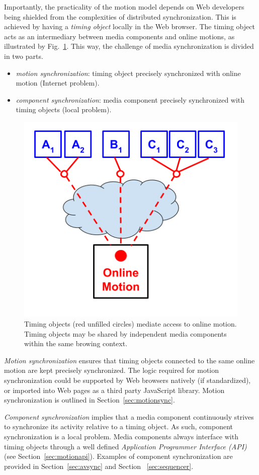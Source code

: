 Importantly, the practicality of the motion model depends on Web developers
being shielded from the complexities of distributed synchronization. This is
achieved by having a \emph{timing object} locally in the Web browser. The
timing object acts as an intermediary between media components and online
motions, as illustrated by Fig.~\ref{fig:model-2}. This way, the challenge of
media synchronization is divided in two parts.

\begin{itemize}
\item{\emph{motion synchronization}: timing object precisely synchronized with online motion (Internet problem).}
\item{\emph{component synchronization}: media component precisely synchronized with timing objects (local problem).} 
\end{itemize}


\begin{figure}[h]
\centering
\includegraphics[scale=.4]{fig/motion-model-2.png}
\caption{Timing objects (red unfilled circles) mediate access to online motion. Timing objects may be shared by independent media components within the same browing context.}
\label{fig:model-2}
\end{figure}

\emph{Motion synchronization} ensures that timing objects connected to the
same online motion are kept precisely synchronized. The logic required for
motion synchronization could be supported by Web browsers natively (if
standardized), or imported into Web pages as a third party JavaScript
library. Motion synchronization is outlined in Section~\ref{sec:motionsync}.

\emph{Component synchronization} implies that a media component continuously
strives to synchronize its activity relative to a timing object. As such,
component synchronization is a local problem. Media components always
interface with timing objects through a well defined \emph{Application Programmer Interface (API)} (see
Section~\ref{sec:motionapi}). Examples of component synchronization are provided in Section~\ref{sec:avsync} and Section
~\ref{sec:sequencer}.

